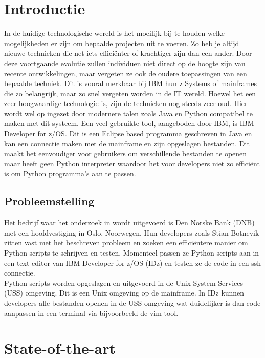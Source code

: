 \newpage
\section{Introductie}%
\label{sec:introductie}
In de huidige technologische wereld is het moeilijk bij te houden welke mogelijkheden er zijn om bepaalde projecten uit te voeren. Zo heb je altijd nieuwe technieken die net iets efficiënter of krachtiger zijn dan een ander. Door deze voortgaande evolutie zullen individuen niet direct op de hoogte zijn van recente ontwikkelingen, maar vergeten ze ook de oudere toepassingen van een bepaalde techniek. Dit is vooral merkbaar bij IBM hun z Systems of mainframes die zo belangrijk, maar zo snel vergeten worden in de IT wereld. Hoewel het een zeer hoogwaardige technologie is, zijn de technieken nog steeds zeer oud. Hier wordt wel op ingezet door modernere talen zoals Java en Python compatibel te maken met dit systeem. Een veel gebruikte tool, aangeboden door IBM, is IBM Developer for z/OS. Dit is een Eclipse based programma geschreven in Java en kan een connectie maken met de mainframe en zijn opgeslagen bestanden. Dit maakt het eenvoudiger voor gebruikers om verschillende bestanden te openen maar heeft geen Python interpreter waardoor het voor developers niet zo efficiënt is om Python programma's aan te passen.


\subsection{Probleemstelling}
Het bedrijf waar het onderzoek in wordt uitgevoerd is Den Norske Bank (DNB) met een hoofdvestiging in Oslo, Noorwegen. Hun developers zoals Stian Botnevik zitten vast met het beschreven probleem en zoeken een efficiëntere manier om Python scripts te schrijven en testen. Momenteel passen ze Python scripts aan in een text editor van IBM Developer for z/OS (IDz) en testen ze de code in een ssh connectie. \\
Python scripts worden opgeslagen en uitgevoerd in de Unix System Services (USS) omgeving. Dit is een Unix omgeving op de mainframe. In IDz kunnen developers alle bestanden openen in de USS omgeving wat duidelijker is dan code aanpassen in een terminal via bijvoorbeeld de vim tool.  



\section{State-of-the-art}%
\label{sec:state-of-the-art}

